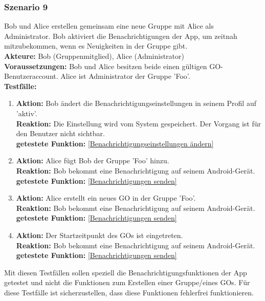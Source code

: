 \documentclass[parskip=full]{scrartcl}
\def\threedigits#1{%
  \ifnum#1<100 0\fi
  \ifnum#1<10 0\fi
  \number#1}
\begin{document}
\subsubsection*{Szenario 9} Bob und Alice erstellen gemeinsam eine neue Gruppe mit Alice als Administrator. Bob aktiviert die Benachrichtigungen der App, um zeitnah mitzubekommen, wenn es Neuigkeiten in der Gruppe gibt.\\

\textbf{Akteure: }Bob (Gruppenmitglied), Alice (Administrator)\\

\textbf{Voraussetzungen: }Bob und Alice besitzen beide einen gültigen GO-Benutzeraccount. Alice ist Administrator der Gruppe 'Foo'.\\

\textbf{Testfälle:}
\begin{enumerate}[label={\textbf{/T\protect\threedigits{\theenumi}0/}}, leftmargin=*, resume]
	\item \textbf{Aktion:} Bob ändert die Benachrichtigungseinstellungen in seinem Profil auf 'aktiv'.\\
	\textbf{Reaktion: }Die Einstellung wird vom System gespeichert. Der Vorgang ist für den Benutzer nicht sichtbar.\\
	\textbf{getestete Funktion:} \ref{Benachrichtigungseinstellungen ändern}
	\item \textbf{Aktion:} Alice fügt Bob der Gruppe 'Foo' hinzu.\\
	\textbf{Reaktion: }Bob bekommt eine Benachrichtigung auf seinem Android-Gerät.\\
	\textbf{getestete Funktion:} \ref{Benachrichtigungen senden}
	\item \textbf{Aktion:} Alice erstellt ein neues GO in der Gruppe 'Foo'.\\
	\textbf{Reaktion: }Bob bekommt eine Benachrichtigung auf seinem Android-Gerät.\\
	\textbf{getestete Funktion:} \ref{Benachrichtigungen senden}
	\item \textbf{Aktion:} Der Startzeitpunkt des GOs ist eingetreten.\\
	\textbf{Reaktion: }Bob bekommt eine Benachrichtigung auf seinem Android-Gerät.\\
	\textbf{getestete Funktion:} \ref{Benachrichtigungen senden}
\end{enumerate}
Mit diesen Testfällen sollen speziell die Benachrichtigungsfunktionen der App getestet und nicht die Funktionen zum Erstellen einer Gruppe/eines GOs. Für diese Testfälle ist sicherzustellen, dass diese Funktionen fehlerfrei funktionieren.


\newpage
\printglossary	
\end{document}
